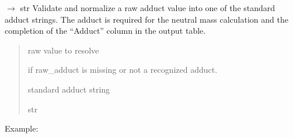 \documentclass[letterpaper,10pt,english]{sphinxmanual}
\begin{document}

\begin{fulllineitems}
\label{\detokenize{api:utils.neutral_mass.adduct}}
\pysigstartsignatures
\pysiglinewithargsret
{}
{}
{{ $\rightarrow$ str}}
\pysigstopsignatures
\sphinxAtStartPar
Validate and normalize a raw adduct value into one of the standard adduct strings. The adduct is required for the neutral mass calculation
and the completion of the “Adduct” column in the output table.
\begin{quote}\begin{description}
\sphinxAtStartPar
{} \textendash{} raw value to resolve

\sphinxAtStartPar
{} \textendash{} if raw\_adduct is missing or not a recognized adduct.

\sphinxAtStartPar
standard adduct string

\sphinxAtStartPar
str

\end{description}\end{quote}

\sphinxAtStartPar
Example:

\begin{sphinxVerbatim}[commandchars=\\\{\}]
\end{sphinxVerbatim}

\end{fulllineitems}

\end{document}
